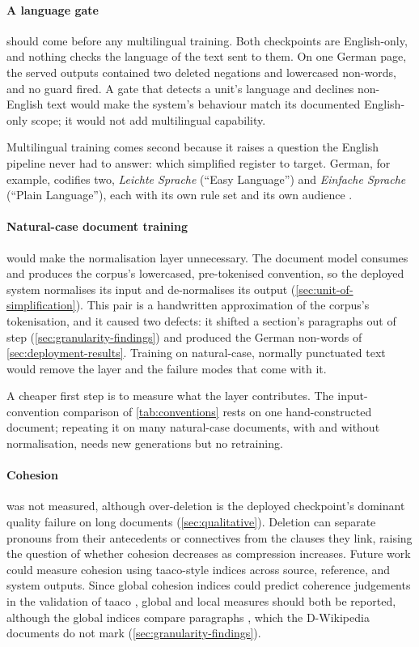 \pagebreak

\paragraph{A language gate} should come before any multilingual training.
Both checkpoints are English-only, and nothing checks the language of the text sent to them.
On one German page, the served outputs contained two deleted negations and lowercased non-words, and no guard fired.
A gate that detects a unit's language and declines non-English text would make the system's behaviour match its documented English-only scope; it would not add multilingual capability.

Multilingual training comes second because it raises a question the English pipeline never had to answer: which simplified register to target.
German, for example, codifies two, \emph{Leichte Sprache} (``Easy Language'') and \emph{Einfache Sprache} (``Plain Language''), each with its own rule set and its own audience \parencite[21, 42]{stodden2026automatic}.

\paragraph{Natural-case document training} would make the normalisation layer unnecessary.
The document model consumes and produces the corpus's lowercased, pre-tokenised convention, so the deployed system normalises its input and de-normalises its output (\cref{sec:unit-of-simplification}).
This pair is a handwritten approximation of the corpus's tokenisation, and it caused two defects: it shifted a section's paragraphs out of step (\cref{sec:granularity-findings}) and produced the German non-words of \cref{sec:deployment-results}.
Training on natural-case, normally punctuated text would remove the layer and the failure modes that come with it.

A cheaper first step is to measure what the layer contributes.
The input-convention comparison of \cref{tab:conventions} rests on one hand-constructed document; repeating it on many natural-case documents, with and without normalisation, needs new generations but no retraining.

\paragraph{Cohesion} was not measured, although over-deletion is the deployed checkpoint's dominant quality failure on long documents (\cref{sec:qualitative}).
Deletion can separate pronouns from their antecedents or connectives from the clauses they link, raising the question of whether cohesion decreases as compression increases.
Future work could measure cohesion using \gls{taaco}-style indices \parencite[1227]{crossley-etal-2016-taaco} across source, reference, and system outputs.
Since global cohesion indices could predict coherence judgements in the validation of \gls{taaco} \parencite[1227, 1233--1234]{crossley-etal-2016-taaco}, global and local measures should both be reported, although the global indices compare paragraphs \parencite[1227]{crossley-etal-2016-taaco}, which the D-Wikipedia documents do not mark (\cref{sec:granularity-findings}).

